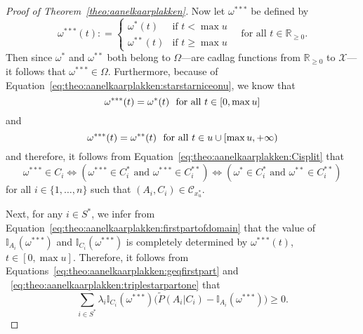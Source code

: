 \documentclass[10pt]{paper}
\theoremstyle{definition}
\newcommand{\reals}{\mathbb{R}}
\newcommand{\states}{\mathcal{X}}
\newcommand{\ind}[1]{\mathbb{I}_{#1}}
\newcommand{\coloneqq}{:\!=}
\begin{document}
\begin{proof}[Proof of Theorem~\ref{theo:aanelkaarplakken}]
Now let $\omega^{***}$ be defined by
\begin{equation*}%
\omega^{***}(t)\coloneqq
\begin{cases}
\omega^{*}(t) & \text{if $t<\max u$}\\
\omega^{**}(t) & \text{if $t\geq \max u$}
\end{cases}
\text{~~~for all $t\in\reals_{\geq0}$.}
\end{equation*}
Then since $\omega^*$ and $\omega^{**}$ both belong to $\Omega$---are cadlag functions from $\reals_{\geq0}$ to $\states$---it follows that $\omega^{***}\in\Omega$. Furthermore, because of Equation~\eqref{eq:theo:aanelkaarplakken:starstarniceonu}, we know that
\begin{equation}\label{eq:theo:aanelkaarplakken:triplestarpartone}
\omega^{***}(t)=\omega^*(t)
\text{~~for all $t\in [0,\max u]$}\vspace{-3mm}
\end{equation}
and
\begin{equation}\label{eq:theo:aanelkaarplakken:triplestarparttwo}
\omega^{***}(t)=\omega^{**}(t)
\text{~~for all $t\in u\cup [\max u,+\infty)$}
\vspace{2mm}
\end{equation}
and therefore, it follows from Equation~\eqref{eq:theo:aanelkaarplakken:Cisplit} that
\begin{equation}\label{eq:theo:aanelkaarplakken:triplestarequivalence}
\omega^{***}\in C_i
\Leftrightarrow
(\omega^{***}\in C_i^*
\text{~and~}
\omega^{***}\in C_i^{**})
\Leftrightarrow
(\omega^{*}\in C_i^*
\text{~and~}
\omega^{**}\in C_i^{**})
\end{equation}
for all $i\in\{1,\dots,n\}$ such that $(A_i,C_i)\in\mathcal{C}_{x_u^*}$.


Next, for any $i\in S^*$, we infer from Equation~\eqref{eq:theo:aanelkaarplakken:firstpartofdomain} that the value of $\ind{A_i}(\omega^{***})$ and $\ind{C_i}(\omega^{***})$ is completely determined by $\omega^{***}(t)$, $t\in[0,\max u]$. Therefore, it follows from Equations~\eqref{eq:theo:aanelkaarplakken:geqfirstpart} and ~\eqref{eq:theo:aanelkaarplakken:triplestarpartone} that 
\begin{equation}\label{eq:theo:aanelkaarplakken:geqfirstparttriplestar}
\sum_{i\in S^*}\lambda_i\ind{C_i}(\omega^{***})\bigl(\tilde{P}(A_i\vert C_i)-\ind{A_i}(\omega^{***})\bigr)
\geq0.
\end{equation}


\end{proof}
\end{document}

